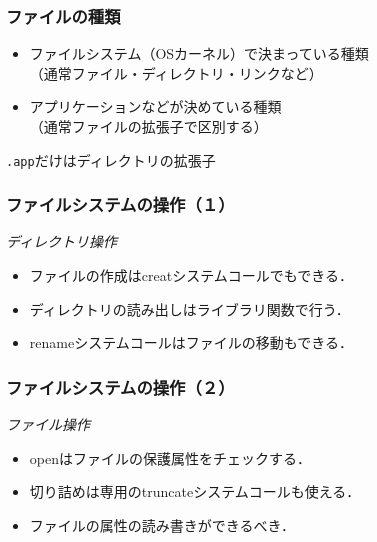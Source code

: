 \documentclass[unicode,handout]{beamer}                   %
\begin{document}
\begin{frame}
  \frametitle{ファイルの種類}
  \begin{itemize}
  \item ファイルシステム（OSカーネル）で決まっている種類 \\
    （通常ファイル・ディレクトリ・リンクなど）
  \item アプリケーションなどが決めている種類 \\
    （通常ファイルの拡張子で区別する）
  \end{itemize}
  \texttt{.app}だけはディレクトリの拡張子
\end{frame}

\begin{frame}
  \frametitle{ファイルシステムの操作（１）}
  \emph{ディレクトリ操作}
  \begin{itemize}
  \item ファイルの作成はcreatシステムコールでもできる．
  \item ディレクトリの読み出しはライブラリ関数で行う．
  \item renameシステムコールはファイルの移動もできる．
  \end{itemize}
\end{frame}

\begin{frame}
  \frametitle{ファイルシステムの操作（２）}
  \emph{ファイル操作}
  \begin{itemize}
  \item openはファイルの保護属性をチェックする．
  \item 切り詰めは専用のtruncateシステムコールも使える．
  \item ファイルの属性の読み書きができるべき．
  \end{itemize}
\end{frame}
\end{document}
